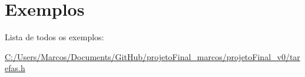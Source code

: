 \section{Exemplos}
Lista de todos os exemplos\+:\begin{DoxyCompactItemize}
\item 
\hyperlink{_c_1_2_users_2_marcos_2_documents_2_git_hub_2projeto_final_marcos_2projeto_final_v0_2tarefas_8h-example}{C\+:/\+Users/\+Marcos/\+Documents/\+Git\+Hub/projeto\+Final\+\_\+marcos/projeto\+Final\+\_\+v0/tarefas.\+h}
\end{DoxyCompactItemize}
